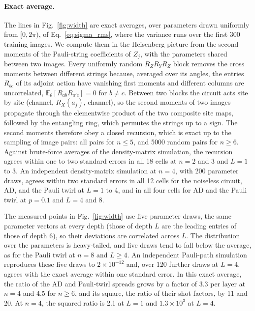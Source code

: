 \documentclass[
 aps,pra,
 twocolumn,
 superscriptaddress,
 longbibliography,
 nofootinbib
]{revtex4-2}
\begin{document}
\paragraph{Exact average.}
The lines in Fig.~\ref{fig:width} are exact averages, over parameters drawn
uniformly from $[0,2\pi)$, of Eq.~\eqref{eq:sigma_rms}, where the variance
runs over the first 300 training images. We compute them in
the Heisenberg picture from the second moments of the Pauli-string
coefficients of $Z_j$, with the parameters shared between two images. Every
uniformly random $R_ZR_YR_Z$ block removes the cross moments between different
strings because, averaged over its angles, the entries $R_{bc}$ of its
adjoint action have vanishing first moments and different columns are
uncorrelated, $\mathbb E_\theta[R_{ab}R_{a'c}]=0$ for $b\neq c$. Between two
blocks the circuit acts site by site (channel, $R_X(a_j)$, channel), so the
second moments of two images propagate through the elementwise product of the
two composite site maps, followed by the entangling ring, which permutes the
strings up to a sign. The second moments therefore obey a closed recursion, which is exact up
to the sampling of image pairs: all pairs for $n\le5$, and 5000 random pairs
for $n\ge6$. Against brute-force averages of the density-matrix simulation,
the recursion agrees within one to two standard errors in all 18 cells at
$n=2$ and 3 and $L=1$ to 3. An independent density-matrix simulation at $n=4$, with 200 parameter draws, agrees within two standard errors in all 12 cells for the noiseless circuit, AD, and the Pauli twirl at $L=1$ to 4, and in all four cells for AD and the Pauli twirl at $p=0.1$ and $L=4$ and 8.

The measured points in
Fig.~\ref{fig:width} use five parameter draws, the same parameter vectors at
every depth (those of depth $L$ are the leading entries of those of depth 6),
so their deviations are correlated across $L$. The distribution over the
parameters is heavy-tailed, and five draws tend to fall below the average, as
for the Pauli twirl at $n=8$ and $L\ge4$. An independent Pauli-path simulation
reproduces these five draws to $2\times10^{-12}$ and, over 120 further draws
at $L=4$, agrees with the exact average within one standard error. In this
exact average, the ratio of the AD and Pauli-twirl spreads grows by a factor
of 3.3 per layer at $n=4$ and 4.5 for $n\ge6$, and its square, the ratio of
their shot factors, by 11 and 20. At $n=4$, the squared ratio is 2.1 at $L=1$
and $1.3\times10^3$ at $L=4$.
\end{document}
